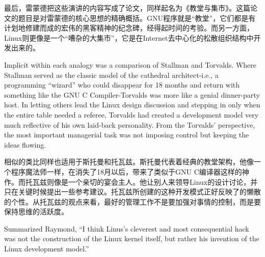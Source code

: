 \ifdefined\chs
最后，雷蒙德把这些演讲的内容写成了论文，同样起名为《教堂与集市》。这篇论文的题目是对雷蒙德的核心思想的精确概括。GNU程序就是``教堂''，它们都是有计划地修建而成的宏伟的黑客精神的纪念碑，经得起时间的考验。而另一方面，Linux则更像是一个``嘈杂的大集市''，它是在Internet去中心化的松散组织结构中开发出来的。
\fi



\ifdefined\eng
Implicit within each analogy was a comparison of Stallman and Torvalds. Where Stallman served as the classic model of the cathedral architect-i.e., a programming ``wizard'' who could disappear for 18 months and return with something like the GNU C Compiler-Torvalds was more like a genial dinner-party host. In letting others lead the Linux design discussion and stepping in only when the entire table needed a referee, Torvalds had created a development model very much reflective of his own laid-back personality. From the Torvalds' perspective, the most important managerial task was not imposing control but keeping the ideas flowing.
\fi

\ifdefined\chs
相似的类比同样也适用于斯托曼和托瓦兹。斯托曼代表着经典的教堂架构，他像一个程序魔法师一样，在消失了18月以后，带来了类似于GNU C编译器这样的神作。而托瓦兹则像是一个亲切的宴会主人。他让别人来领导Linux的设计讨论，并只在关键时候提出一些参考建议。托瓦兹所创建的这种开发模式正好反映了的懒散的个性。从托瓦兹的观点来看，最好的管理工作不是要加强对事情的控制，而是要保持思维的活跃度。
\fi

\ifdefined\eng
Summarized Raymond, ``I think Linus's cleverest and most consequential hack was not the construction of the Linux kernel itself, but rather his invention of the Linux development model.''
\fi

